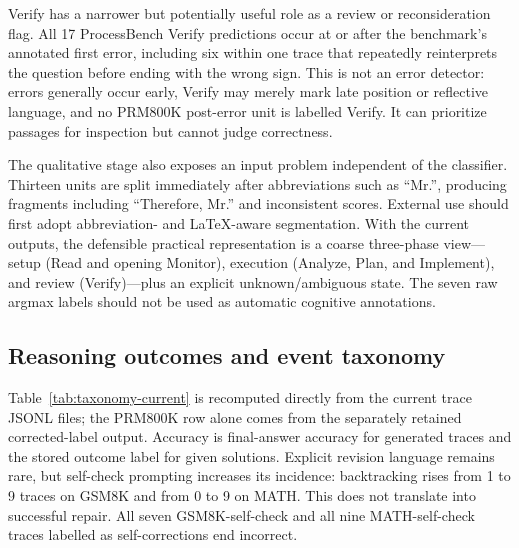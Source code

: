 \documentclass[manuscript,screen,review]{jair}
\begin{document}
Verify has a narrower but potentially useful role as a review or
reconsideration flag.  All 17 ProcessBench Verify predictions occur at or
after the benchmark's annotated first error, including six within one trace
that repeatedly reinterprets the question before ending with the wrong sign.
This is not an error detector: errors generally occur early, Verify may merely
mark late position or reflective language, and no PRM800K post-error unit is
labelled Verify.  It can prioritize passages for inspection but cannot judge
correctness.

The qualitative stage also exposes an input problem independent of the
classifier.  Thirteen units are split immediately after abbreviations such as
``Mr.'', producing fragments including ``Therefore, Mr.'' and inconsistent
scores.  External use should first adopt abbreviation- and LaTeX-aware
segmentation.  With the current outputs, the defensible practical
representation is a coarse three-phase view---setup (Read and opening
Monitor), execution (Analyze, Plan, and Implement), and review (Verify)---plus
an explicit unknown/ambiguous state.  The seven raw argmax labels should not
be used as automatic cognitive annotations.

\subsection{Reasoning outcomes and event taxonomy}

Table~\ref{tab:taxonomy-current} is recomputed directly from the current
trace JSONL files; the PRM800K row alone comes from the separately retained
corrected-label output.  Accuracy is final-answer accuracy for generated
traces and the stored outcome label for given solutions.  Explicit revision
language remains rare, but self-check prompting increases its incidence:
backtracking rises from 1 to 9 traces on GSM8K and from 0 to 9 on MATH.  This
does not translate into successful repair.  All seven GSM8K-self-check and
all nine MATH-self-check traces labelled as self-corrections end incorrect.
\end{document}
